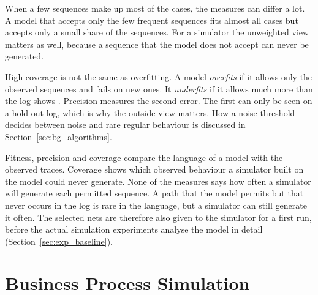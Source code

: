 When a few sequences make up most of the cases, the measures can differ a lot. A
model that accepts only the few frequent sequences fits almost all cases but
accepts only a small share of the sequences. For a simulator the unweighted view
matters as well, because a sequence that the model does not accept can never be
generated.

High coverage is not the same as overfitting. A model \emph{overfits} if it
allows only the observed sequences and fails on new ones. It \emph{underfits} if
it allows much more than the log shows \cite{Aalst2016}. Precision measures the
second error. The first can only be seen on a hold-out log, which is why the
outside view matters. How a noise threshold decides between noise and rare
regular behaviour is discussed in Section~\ref{sec:bg_algorithms}.

Fitness, precision and coverage compare the language of a model with the
observed traces. Coverage shows which observed behaviour a simulator built on the
model could never generate. None of the measures says how often a simulator will
generate each permitted sequence. A path that the model permits but that never
occurs in the log is rare in the language, but a simulator can still generate it
often. The selected nets are therefore also given to the simulator for a first
run, before the actual simulation experiments analyse the model in detail
(Section~\ref{sec:exp_baseline}).

\section{Business Process Simulation}
\label{sec:bps_models}

